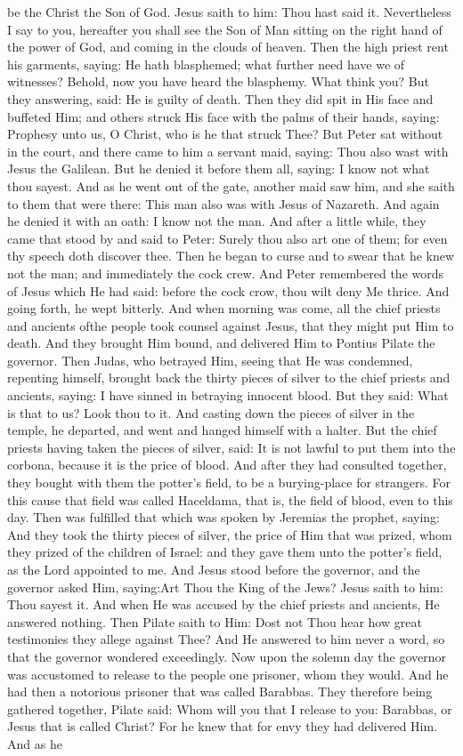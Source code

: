 {{be the Christ the Son of God. Jesus saith to him: Thou hast said it. Nevertheless I say to you, hereafter you shall see the Son of Man sitting on the right hand of the power of God, and coming in the clouds of heaven. Then the high priest rent his garments, saying: He hath blasphemed; what further need have we of witnesses? Behold, now you have heard the blasphemy. What think you? But they answering, said: He is guilty of death. Then they did spit in His face and buffeted Him; and others struck His face with the palms of their hands, saying: Prophesy unto us, O Christ, who is he that struck Thee?  But Peter sat without in the court, and there came to him a servant maid, saying: Thou also wast with Jesus the Galilean. But he denied it before them all, saying: I know not what thou sayest. And as he went out of the gate, another maid saw him, and she saith to them that were there: This man also was with Jesus of Nazareth. And again he denied it with an oath: I know not the man. And after a little while, they came that stood by and said to Peter: Surely thou also art one of them; for even thy speech doth discover thee. Then he began to curse and to swear that he knew not the man; and immediately the cock crew. And Peter remembered the words of Jesus which He had said: before the cock crow, thou wilt deny Me thrice. And going forth, he wept bitterly. And when morning was come, all the chief priests and ancients ofthe people took counsel against Jesus, that they might put Him to death. And they brought Him bound, and delivered Him to Pontius Pilate the governor.  Then Judas, who betrayed Him, seeing that He was condemned, repenting himself, brought back the thirty pieces of silver to the chief priests and ancients, saying: I have sinned in betraying innocent blood. But they said: What is that to us? Look thou to it. And casting down the pieces of silver in the temple, he departed, and went and hanged himself with a halter. But the chief priests having taken the pieces of silver, said: It is not lawful to put them into the corbona, because it is the price of blood. And after they had consulted together, they bought with them the potter's field, to be a burying-place for strangers. For this cause that field was called Haceldama, that is, the field of blood, even to this day. Then was fulfilled that which was spoken by Jeremias the prophet, saying: And they took the thirty pieces of silver, the price of Him that was prized, whom they prized of the children of Israel: and they gave them unto the potter's field, as the Lord appointed to me.  And Jesus stood before the governor, and the governor asked Him, saying:Art Thou the King of the Jews? Jesus saith to him: Thou sayest it. And when He was accused by the chief priests and ancients, He answered nothing. Then Pilate saith to Him: Dost not Thou hear how great testimonies they allege against Thee? And He answered to him never a word, so that the governor wondered exceedingly. Now upon the solemn day the governor was accustomed to release to the people one prisoner, whom they would. And he had then a notorious prisoner that was called Barabbas. They therefore being gathered together, Pilate said: Whom will you that I release to you: Barabbas, or Jesus that is called Christ? For he knew that for envy they had delivered Him. And as he }}
